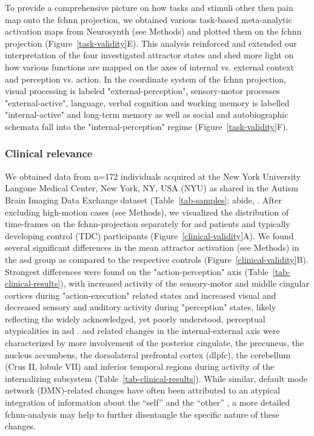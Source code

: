 \documentclass{article}
\begin{document}
To provide a comprehensive picture on how tasks and stimuli other then pain map onto the \acrshort{fchnn} projection, we obtained various task-based meta-analytic activation maps from Neurosynth (see Methods) and plotted them on the \acrshort{fchnn} projection (Figure~\ref{task-validity}E). This analysis reinforced and extended our interpretation of the four investigated attractor states and shed more light on how various functions are mapped on the axes of internal vs. external context and perception vs. action.
In the coordinate system of the \acrshort{fchnn} projection, visual processing is labeled "external-perception", sensory-motor processes "external-active", language, verbal cognition and working memory is labelled "internal-active" and long-term memory as well as social and autobiographic schemata fall into the "internal-perception" regime (Figure~\ref{task-validity}F).

\subsubsection{Clinical relevance}

We obtained data from n=172 individuals acquired at the New York University Langone Medical Center, New York, NY, USA (NYU) as shared in the Autism Brain Imaging Data Exchange dataset (Table~\ref{tab-samples}: \acrshort{abide}, \citep{di2014autism}.
After excluding high-motion cases (see Methods), we visualized the distribution of time-frames on the \acrshort{fchnn}-projection separately for \acrshort{asd} patients and typically developing control (TDC) participants (Figure~\ref{clinical-validity}A).
We found several significant differences in the mean attractor activation (see Methods) in the \acrshort{asd} group as compared to the respective controls (Figure~\ref{clinical-validity}B).
Strongest differences were found on the "action-perception" axis (Table~\ref{tab-clinical-results}), with increased activity of the sensory-motor and mid\acrshort{dl}e cingular cortices during "action-execution" related states and increased visual and decreased sensory and auditory activity during "perception" states, likely reflecting the widely acknowledged, yet poorly understood, perceptual atypicalities in \acrshort{asd} \citep{hadad2019perception}. \acrshort{asd} related changes in the internal-external axis were characterized by more involvement of the posterior cingulate, the precuneus, the nucleus accumbens, the dorsolateral prefrontal cortex (\acrshort{dl}\acrshort{pfc}), the cerebellum (Crus II, lobule VII) and inferior temporal regions during activity of the internalizing subsystem (Table~\ref{tab-clinical-results}). While similar, default mode network (DMN)-related changes have often been attributed to an atypical integration of information about the ``self'' and the ``other'' \citep{padmanabhan2017default}, a more detailed \acrshort{fchnn}-analysis may help to further disentangle the specific nature of these changes.
\end{document}
